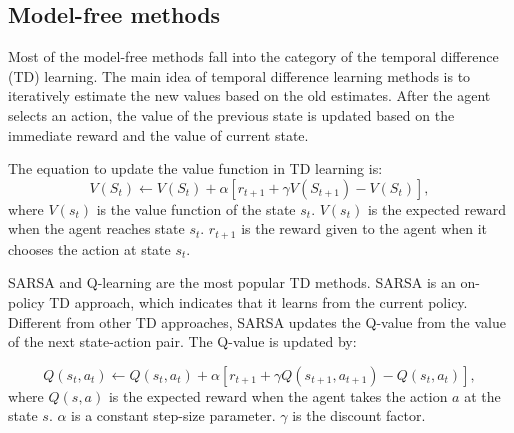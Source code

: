 \subsection{Model-free methods}
\label{se:modelfree}
Most of the model-free methods fall into the category of the temporal difference (TD)
learning. The main idea of temporal difference learning methods is to iteratively
estimate the new values based on the old estimates. After the agent selects an action,
the value of the previous state is updated based on the immediate reward and the 
value of current state.


The equation to update the value function in TD learning is:
\begin{displaymath}
   V(S_t) \leftarrow V(S_t) + \alpha [r_{t+1} + \gamma V(S_{t+1}) - V(S_t)],
\end{displaymath}
where $V(s_t)$ is the value function of the state $s_t$. $V(s_t)$ is the expected reward when
the agent reaches state $s_t$. $r_{t+1}$ is the reward given to the agent when it chooses
the action at state $s_t$.

SARSA\cite{Rummery94} and Q-learning\cite{Watkins89} are the most popular TD
methods. SARSA is an on-policy TD approach, which indicates that it learns
from the current policy. Different from other TD approaches, SARSA updates the
Q-value from the value of the next state-action pair. The Q-value is
updated by:

\begin{displaymath}
    Q(s_t, a_t) \leftarrow Q(s_t, a_t) + \alpha [r_{t+1} + \gamma Q(s_{t+1}, a_{t+1})-Q(s_t, a_t)],
\end{displaymath}
where $Q(s, a)$ is the expected reward when the agent takes the action $a$ at
the state $s$. $\alpha$ is a constant step-size parameter. $\gamma$ is the
discount factor.

